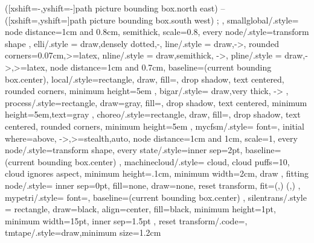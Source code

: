 {{{{        ([xshift=-\gatedistancein,yshift=-\gatedistancein]path picture bounding box.north east) --
        ([xshift=\gatedistancein,yshift=\gatedistancein]path picture bounding box.south west)
        ;}}
  },
  smallglobal/.style={
        node distance=1cm and 0.8cm, semithick, scale=0.8, every node/.style={transform shape}
  },
  elli/.style = {draw,densely dotted,-},
  line/.style = {draw,->, rounded corners=0.07cm,>=latex},
  nline/.style = {draw,semithick, ->},
  pline/.style = {draw,->,>=latex},
  node distance=1cm and 0.7cm,
  baseline=(current  bounding  box.center),
  local/.style={rectangle, draw, fill=\fillcolor, drop shadow,
    text centered, rounded corners, minimum height=5em
  },
  bigar/.style={
    draw,very thick, ->
  },
  process/.style={rectangle, draw=gray, fill=\fillcolor, drop shadow,
    text centered, minimum height=5em,text=gray
  },
  choreo/.style={rectangle, draw, fill=\fillcolor, drop shadow,
    text centered, rounded corners, minimum height=5em
  },
  mycfsm/.style={
        font=\footnotesize,
        initial where=above,
        ->,>=stealth,auto, node distance=1cm and 1cm,
        scale=1, every node/.style={transform shape},
        every state/.style=inner sep=2pt,
        baseline=(current  bounding  box.center)
  },
  machinecloud/.style={
    cloud, cloud puffs=10, cloud ignores aspect, minimum height=.1cm, minimum width=2cm, draw
  },
  fitting node/.style={
    inner sep=0pt,
    fill=none,
    draw=none,
    reset transform,
    fit={(\pgf@pathminx,\pgf@pathminy) (\pgf@pathmaxx,\pgf@pathmaxy)}
  },
  mypetri/.style={
    font=\footnotesize,
    baseline=(current  bounding  box.center)
  },
  silentrans/.style = {rectangle, draw=black, align=center, fill=black,
    minimum height=1pt,
    minimum width=15pt,
    inner sep=1.5pt
  },
  reset transform/.code={\pgftransformreset},
  tmtape/.style={draw,minimum size=1.2cm}
}

